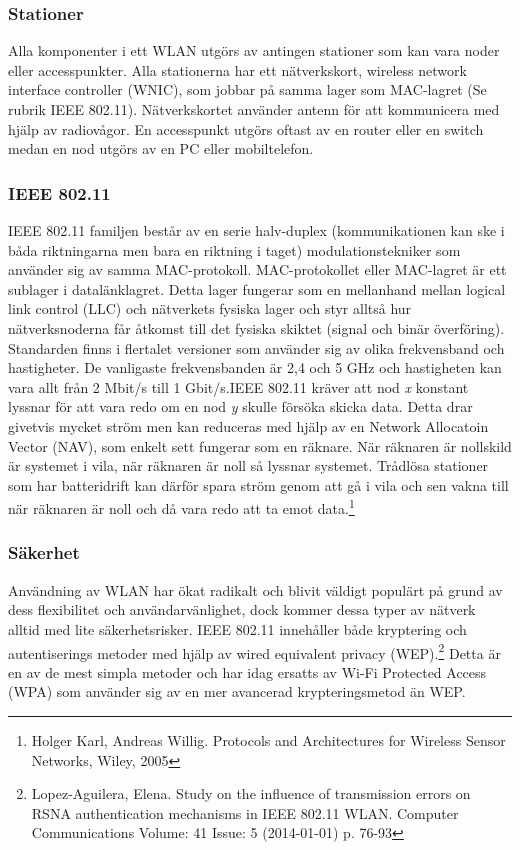 \documentclass[a4paper,12pt,fleqn]{article}
\begin{document}
\subsubsection{Stationer}
Alla komponenter i ett WLAN utgörs av antingen stationer som kan vara noder eller accesspunkter. Alla stationerna har ett nätverkskort, wireless network interface controller (WNIC), som jobbar på samma lager som MAC-lagret (Se rubrik IEEE 802.11). Nätverkskortet använder antenn för att kommunicera med hjälp av radiovågor. En accesspunkt utgörs oftast av en router eller en switch medan en nod utgörs av en PC eller mobiltelefon.

\subsubsection{IEEE 802.11}
IEEE 802.11 familjen består av en serie halv-duplex (kommunikationen kan ske i båda riktningarna men bara en riktning i taget) modulationstekniker som använder sig av samma MAC-protokoll. MAC-protokollet eller MAC-lagret är ett sublager i datalänklagret. Detta lager fungerar som en mellanhand mellan logical link control (LLC) och nätverkets fysiska lager och styr alltså hur nätverksnoderna får åtkomst till det fysiska skiktet (signal och binär överföring). 
\\
\newline
Standarden finns i flertalet versioner som använder sig av olika frekvensband och hastigheter. De vanligaste frekvensbanden är 2,4 och 5 GHz och hastigheten kan vara allt från 2 Mbit/s till 1 Gbit/s.IEEE 802.11 kräver att nod \emph{x} konstant lyssnar för att vara redo om en nod \emph{y} skulle försöka skicka data. Detta drar givetvis mycket ström men kan reduceras med hjälp av en Network Allocatoin Vector (NAV), som enkelt sett fungerar som en räknare. När räknaren är nollskild är systemet i vila, när räknaren är noll så lyssnar systemet. Trådlösa stationer som har batteridrift kan därför spara ström genom att gå i vila och sen vakna till när räknaren är noll och då vara redo att ta emot data.\footnote{Holger Karl, Andreas Willig. Protocols and Architectures for Wireless Sensor Networks, Wiley, 2005}

\subsubsection{Säkerhet}
Användning av WLAN har ökat radikalt och blivit väldigt populärt på grund av dess flexibilitet och användarvänlighet, dock kommer dessa typer av nätverk alltid med lite säkerhetsrisker. IEEE 802.11 innehåller både kryptering och autentiserings metoder med hjälp av wired equivalent privacy (WEP).\footnote{Lopez-Aguilera, Elena. Study on the influence of transmission errors on RSNA authentication mechanisms in IEEE 802.11 WLAN. Computer Communications Volume: 41 Issue: 5 (2014-01-01) p. 76-93} Detta är en av de mest simpla metoder och har idag ersatts av  Wi-Fi Protected Access (WPA) som använder sig av en mer avancerad krypteringsmetod än WEP.
\newpage 
\end{document}
